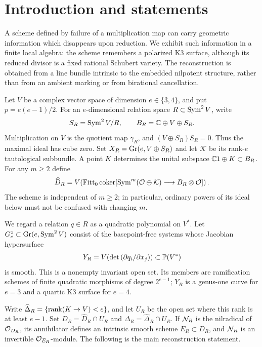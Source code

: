 \section{Introduction and statements}
A scheme defined by failure of a multiplication map can carry geometric
information which disappears upon reduction. We exhibit such information
in a finite local algebra: the scheme remembers a polarized K3 surface,
although its reduced divisor is a fixed rational Schubert variety.
The reconstruction is obtained from a line bundle intrinsic to the
embedded nilpotent structure, rather than from an ambient marking or
from birational cancellation.

Let $V$ be a complex vector space of dimension $e\in\{3,4\}$, and put
$p=e(e-1)/2$. For an $e$-dimensional relation space
$R\subset\operatorname{Sym}^2V$, write
\begin{equation}\label{eq:algebra}
 S_R=\operatorname{Sym}^2V/R,\qquad
 B_R=\mathbb C\oplus V\oplus S_R.
\end{equation}
Multiplication on $V$ is the quotient map $\gamma_R$, and
$(V\oplus S_R)S_R=0$. Thus the maximal ideal has cube zero.
Set $X_R=\operatorname{Gr}(e,V\oplus S_R)$ and let $\mathcal K$ be its
rank-$e$ tautological subbundle. A point $K$ determines the unital
subspace $\mathbb C1\oplus K\subset B_R$. For any $m\ge2$ define
\begin{equation}\label{eq:full-failure}
 \widehat D_R=V\!\left(\operatorname{Fitt}_0\operatorname{coker}
 [\operatorname{Sym}^m(\mathcal O\oplus\mathcal K)\longrightarrow B_R\otimes\mathcal O]\right).
\end{equation}
The scheme is independent of $m\ge2$; in particular, ordinary powers
of its ideal below must not be confused with changing $m$.

We regard a relation $q\in R$ as a quadratic polynomial on $V^*$.
Let $G_e^\circ\subset\operatorname{Gr}(e,\operatorname{Sym}^2V)$ consist of the basepoint-free
systems whose Jacobian hypersurface
\begin{equation}\label{eq:Y-intro}
 Y_R=V\!\left(\det\left(\partial q_i/\partial x_j\right)\right)
       \subset\mathbb P(V^*)
\end{equation}
is smooth. This is a nonempty invariant open set. Its members are
ramification schemes of finite quadratic morphisms of degree
$2^{e-1}$; $Y_R$ is a genus-one curve for $e=3$ and a quartic K3
surface for $e=4$.

Write $\widehat\Delta_R=\{\operatorname{rank}(K\to V)<e\}$, and let $U_R$
be the open set where this rank is at least $e-1$. Set
$D_R=\widehat D_R\cap U_R$ and $\Delta_R=\widehat\Delta_R\cap U_R$.
If $\mathcal N_R$ is the nilradical of $\mathcal O_{D_R}$, its annihilator defines
an intrinsic smooth scheme $E_R\subset D_R$, and $\mathcal N_R$ is an
invertible $\mathcal O_{E_R}$-module. The following is the main reconstruction
statement.

